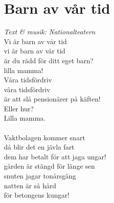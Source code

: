\section{Barn av vår tid}
\textit{Text \& musik: Nationalteatern}
\vspace{2mm}\\
Vi är barn av vår tid\\
vi är barn av vår tid\\
är du rädd för ditt eget barn?\\
lilla mamma!\\
Våra tidsfördriv\\
våra tidsfördriv\\
är att slå pensionärer på käften!\\
Eller hur?\\
Lilla mamma.\\
\\
Vaktbolagen kommer snart\\
då blir det en jävla fart\\
dem har betalt för att jaga ungar!\\
gården är stängd för länge sen\\
snuten jagar tonårsgäng\\
natten är så hård\\
för betongens kungar!\\

